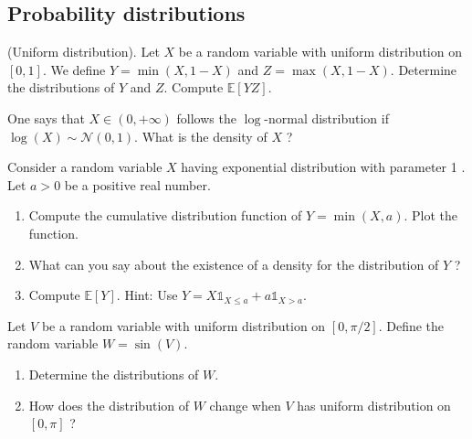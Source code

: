 \begin{center}
  \section*{Probability distributions}
\end{center}

\begin{Exercise} (Uniform distribution). Let $X$ be a random variable with uniform distribution on $[0,1]$. We define $Y=\min (X, 1-X)$ and $Z=\max (X, 1-X)$. Determine the distributions of $Y$ and $Z$. Compute $\mathbb{E}[Y Z]$.

\end{Exercise} \begin{Exercise} One says that $X \in(0,+\infty)$ follows the $\log$-normal distribution if $\log (X) \sim \mathcal{N}(0,1)$. What is the density of $X$ ?

\end{Exercise} \begin{Exercise} Consider a random variable $X$ having exponential distribution with parameter 1 . Let $a>0$ be a positive real number.

  \begin{enumerate}
    \item Compute the cumulative distribution function of $Y=\min (X, a)$. Plot the function.

    \item What can you say about the existence of a density for the distribution of $Y$ ?

    \item Compute $\mathbb{E}[Y]$. Hint: Use $Y=X \mathbb{1}_{X \leq a}+a \mathbb{1}_{X>a}$.

  \end{enumerate}

\end{Exercise}

\begin{Exercise} Let $V$ be a random variable with uniform distribution on $[0, \pi / 2]$. Define the random variable $W=\sin (V)$.

  \begin{enumerate}
    \item Determine the distributions of $W$.

    \item How does the distribution of $W$ change when $V$ has uniform distribution on $[0, \pi]$ ?

  \end{enumerate}

\end{Exercise}

